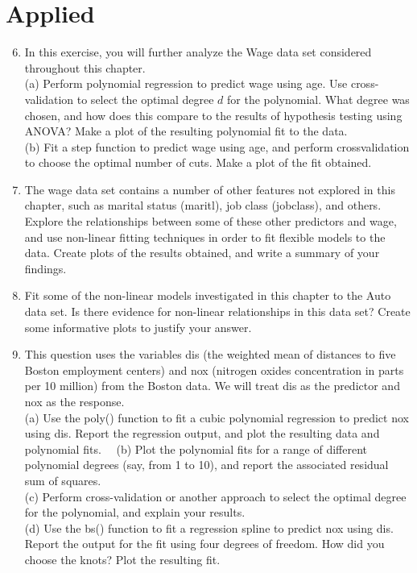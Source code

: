 \documentclass[10pt]{article}
\begin{document}
\section*{Applied}
\begin{enumerate}
  \setcounter{enumi}{5}
  \item In this exercise, you will further analyze the Wage data set considered throughout this chapter.\\
(a) Perform polynomial regression to predict wage using age. Use cross-validation to select the optimal degree $d$ for the polynomial. What degree was chosen, and how does this compare to the results of hypothesis testing using ANOVA? Make a plot of the resulting polynomial fit to the data.\\
(b) Fit a step function to predict wage using age, and perform crossvalidation to choose the optimal number of cuts. Make a plot of the fit obtained.
  \item The wage data set contains a number of other features not explored in this chapter, such as marital status (maritl), job class (jobclass), and others. Explore the relationships between some of these other predictors and wage, and use non-linear fitting techniques in order to fit flexible models to the data. Create plots of the results obtained, and write a summary of your findings.
  \item Fit some of the non-linear models investigated in this chapter to the Auto data set. Is there evidence for non-linear relationships in this data set? Create some informative plots to justify your answer.
  \item This question uses the variables dis (the weighted mean of distances to five Boston employment centers) and nox (nitrogen oxides concentration in parts per 10 million) from the Boston data. We will treat dis as the predictor and nox as the response.\\
(a) Use the poly() function to fit a cubic polynomial regression to predict nox using dis. Report the regression output, and plot the resulting data and polynomial fits.\
\
(b) Plot the polynomial fits for a range of different polynomial degrees (say, from 1 to 10), and report the associated residual sum of squares.\\
(c) Perform cross-validation or another approach to select the optimal degree for the polynomial, and explain your results.\\
(d) Use the bs() function to fit a regression spline to predict nox using dis. Report the output for the fit using four degrees of freedom. How did you choose the knots? Plot the resulting fit.\\

\end{enumerate}
\end{document}
